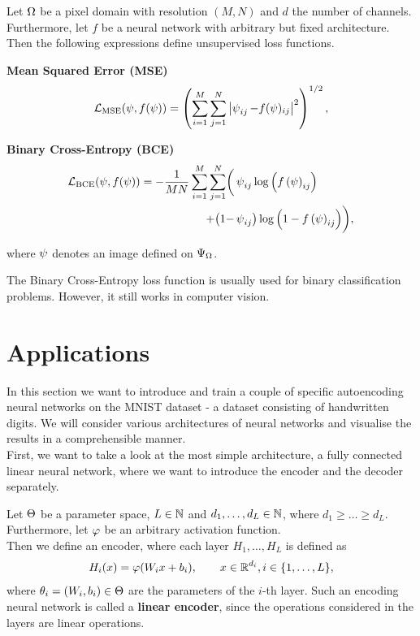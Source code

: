 \begin{example}
Let $\Omega$ be a pixel domain with resolution $(M,N)$ and $d$ the number of channels. Furthermore, let $f$ be a neural network with arbitrary but fixed architecture. Then the following expressions define unsupervised loss functions.
\begin{mydescription}{}
\item[\textbf{Mean Squared Error (MSE)}] \begin{align*}
\operatorname{\operatorname{\mathcal{L}}_\text{MSE}}(\operatorname{\psi}, f(\operatorname{\psi})) = \left(\sum_{i=1}^{M}\sum_{j=1}^{N}\left|\operatorname{\psi}_{ij} - f(\operatorname{\psi})_{ij}\right|^2\right)^{1/2},
\end{align*}
\item[\textbf{Binary Cross-Entropy (BCE)}]
\begin{align*}
\operatorname{\operatorname{\mathcal{L}}_\text{BCE}}(\operatorname{\psi}, f(\operatorname{\psi})) = - \frac{1}{MN}\sum_{i=1}^{M}\sum_{j=1}^{N} \biggl(&\operatorname{\psi}_{ij} \log\left(f\left(\operatorname{\psi}\right)_{ij}\right)\\ + \bigl(1-&\operatorname{\psi}_{ij}\bigr)\log\left(1 - f\left(\operatorname{\psi}\right)_{ij}\right)\biggr),
\end{align*}
\end{mydescription}
where $\operatorname{\psi}$ denotes an image defined on $\Psi_{\Omega}$.
\end{example}


\begin{remark}
The Binary Cross-Entropy loss function is usually used for binary classification problems. However, it still works in computer vision.
\end{remark}


\section{Applications}\label{sec:ae_applications}
In this section we want to introduce and train a couple of specific autoencoding neural networks on the MNIST dataset - a dataset consisting of handwritten digits. We will consider various architectures of neural networks and visualise the results in a comprehensible manner.\\
First, we want to take a look at the most simple architecture, a fully connected linear neural network, where we want to introduce the encoder and the decoder separately.

\begin{definition}\label{def:linear_encoder}
Let $\operatorname{\Theta}$ be a parameter space, $L\in \operatorname{\mathbb{N}}$ and $d_1,\ldots,d_L \in \operatorname{\mathbb{N}}$, where $d_1\geq \ldots \geq d_L$. Furthermore, let $\operatorname{\varphi}$ be an arbitrary activation function.\\
Then we define an encoder, where each layer $H_1,\ldots, H_L$ is defined as
\begin{align*}
H_i(x) = \operatorname{\varphi}(W_ix + b_i), \qquad x \in \operatorname{\mathbb{R}}^{d_i}, i \in \{1,\ldots, L\},
\end{align*}
where $\theta_i = (W_i, b_i)\in\operatorname{\Theta}$ are the parameters of the $i$-th layer. Such an encoding neural network is called a \textbf{linear encoder}, since the operations considered in the layers are linear operations.
\end{definition}

